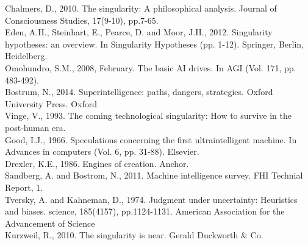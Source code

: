 \documentclass[11pt]{article}
\begin{document}
Chalmers, D., 2010. The singularity: A philosophical analysis. Journal of Consciousness Studies, 17(9-10), pp.7-65.\\
Eden, A.H., Steinhart, E., Pearce, D. and Moor, J.H., 2012. Singularity hypotheses: an overview. In Singularity Hypotheses (pp. 1-12). Springer, Berlin, Heidelberg.\\
Omohundro, S.M., 2008, February. The basic AI drives. In AGI (Vol. 171, pp. 483-492).\\
Bostrum, N., 2014. Superintelligence: paths, dangers, strategies. Oxford University Press. Oxford\\
Vinge, V., 1993. The coming technological singularity: How to survive in the post-human era.\\
Good, I.J., 1966. Speculations concerning the first ultraintelligent machine. In Advances in computers (Vol. 6, pp. 31-88). Elsevier.\\
Drexler, K.E., 1986. Engines of creation. Anchor.\\
Sandberg, A. and Bostrom, N., 2011. Machine intelligence survey. FHI Technial Report, 1.\\
Tversky, A. and Kahneman, D., 1974. Judgment under uncertainty: Heuristics and biases. science, 185(4157), pp.1124-1131. American Association for the Advancement of Science\\
Kurzweil, R., 2010. The singularity is near. Gerald Duckworth \& Co.\\
\end{document}
